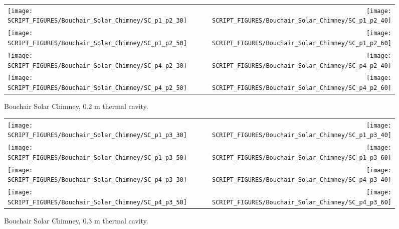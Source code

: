 \begin{figure}[p]
\begin{tabular*}{\textwidth}{l@{\extracolsep{\fill}}r}
\texttt{[image: SCRIPT\_FIGURES/Bouchair\_Solar\_Chimney/SC\_p1\_p2\_30]} &
\texttt{[image: SCRIPT\_FIGURES/Bouchair\_Solar\_Chimney/SC\_p1\_p2\_40]} \\
\texttt{[image: SCRIPT\_FIGURES/Bouchair\_Solar\_Chimney/SC\_p1\_p2\_50]} &
\texttt{[image: SCRIPT\_FIGURES/Bouchair\_Solar\_Chimney/SC\_p1\_p2\_60]} \\
\texttt{[image: SCRIPT\_FIGURES/Bouchair\_Solar\_Chimney/SC\_p4\_p2\_30]} &
\texttt{[image: SCRIPT\_FIGURES/Bouchair\_Solar\_Chimney/SC\_p4\_p2\_40]} \\
\texttt{[image: SCRIPT\_FIGURES/Bouchair\_Solar\_Chimney/SC\_p4\_p2\_50]} &
\texttt{[image: SCRIPT\_FIGURES/Bouchair\_Solar\_Chimney/SC\_p4\_p2\_60]}
\end{tabular*}
\caption[Bouchair Solar Chimney, 0.2 m thermal cavity]{Bouchair Solar Chimney, 0.2 m thermal cavity.}
\label{Bouchair_p2}
\end{figure}

\begin{figure}[p]
\begin{tabular*}{\textwidth}{l@{\extracolsep{\fill}}r}
\texttt{[image: SCRIPT\_FIGURES/Bouchair\_Solar\_Chimney/SC\_p1\_p3\_30]} &
\texttt{[image: SCRIPT\_FIGURES/Bouchair\_Solar\_Chimney/SC\_p1\_p3\_40]} \\
\texttt{[image: SCRIPT\_FIGURES/Bouchair\_Solar\_Chimney/SC\_p1\_p3\_50]} &
\texttt{[image: SCRIPT\_FIGURES/Bouchair\_Solar\_Chimney/SC\_p1\_p3\_60]} \\
\texttt{[image: SCRIPT\_FIGURES/Bouchair\_Solar\_Chimney/SC\_p4\_p3\_30]} &
\texttt{[image: SCRIPT\_FIGURES/Bouchair\_Solar\_Chimney/SC\_p4\_p3\_40]} \\
\texttt{[image: SCRIPT\_FIGURES/Bouchair\_Solar\_Chimney/SC\_p4\_p3\_50]} &
\texttt{[image: SCRIPT\_FIGURES/Bouchair\_Solar\_Chimney/SC\_p4\_p3\_60]}
\end{tabular*}
\caption[Bouchair Solar Chimney, 0.3 m thermal cavity]{Bouchair Solar Chimney, 0.3 m thermal cavity.}
\label{Bouchair_p3}
\end{figure}

